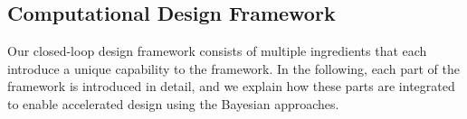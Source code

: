 




\subsection{Computational Design Framework}

Our closed-loop design framework consists of multiple ingredients that each introduce a unique capability to the framework. In the following, each part of the framework is introduced in detail, and we explain how these parts are integrated to enable accelerated design using the Bayesian approaches.


